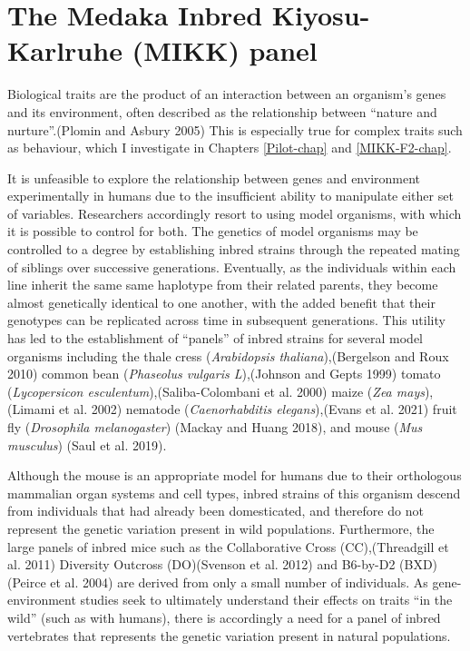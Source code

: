 \documentclass[
]{book}
\begin{document}
\hypertarget{the-medaka-inbred-kiyosu-karlruhe-mikk-panel}{%
\section{The Medaka Inbred Kiyosu-Karlruhe (MIKK) panel}\label{the-medaka-inbred-kiyosu-karlruhe-mikk-panel}}

Biological traits are the product of an interaction between an organism's genes and its environment, often described as the relationship between ``nature and nurture''.(Plomin and Asbury 2005) This is especially true for complex traits such as behaviour, which I investigate in Chapters \ref{Pilot-chap} and \ref{MIKK-F2-chap}.

It is unfeasible to explore the relationship between genes and environment experimentally in humans due to the insufficient ability to manipulate either set of variables. Researchers accordingly resort to using model organisms, with which it is possible to control for both. The genetics of model organisms may be controlled to a degree by establishing inbred strains through the repeated mating of siblings over successive generations. Eventually, as the individuals within each line inherit the same same haplotype from their related parents, they become almost genetically identical to one another, with the added benefit that their genotypes can be replicated across time in subsequent generations. This utility has led to the establishment of ``panels'' of inbred strains for several model organisms including the thale cress (\emph{Arabidopsis thaliana}),(Bergelson and Roux 2010) common bean (\emph{Phaseolus vulgaris L}),(Johnson and Gepts 1999) tomato (\emph{Lycopersicon esculentum}),(Saliba-Colombani et al. 2000) maize (\emph{Zea mays}),(Limami et al. 2002) nematode (\emph{Caenorhabditis elegans}),(Evans et al. 2021) fruit fly (\emph{Drosophila melanogaster}) (Mackay and Huang 2018), and mouse (\emph{Mus musculus}) (Saul et al. 2019).

Although the mouse is an appropriate model for humans due to their orthologous mammalian organ systems and cell types, inbred strains of this organism descend from individuals that had already been domesticated, and therefore do not represent the genetic variation present in wild populations. Furthermore, the large panels of inbred mice such as the Collaborative Cross (CC),(Threadgill et al. 2011) Diversity Outcross (DO)(Svenson et al. 2012) and B6-by-D2 (BXD)(Peirce et al. 2004) are derived from only a small number of individuals. As gene-environment studies seek to ultimately understand their effects on traits ``in the wild'' (such as with humans), there is accordingly a need for a panel of inbred vertebrates that represents the genetic variation present in natural populations.
\end{document}
